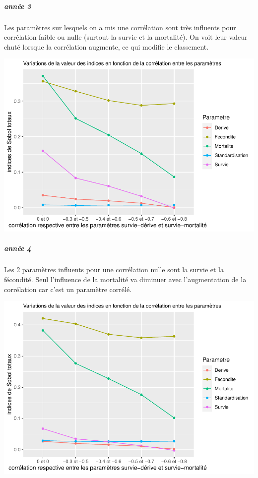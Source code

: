\documentclass[
]{article}
\begin{document}
\hypertarget{annuxe9e-3-4}{%
\subparagraph{année 3}\label{annuxe9e-3-4}}

Les paramètres sur lesquels on a mis une corrélation sont très influents
pour corrélation faible ou nulle (surtout la survie et la mortalité). On
voit leur valeur chuté lorsque la corrélation augmente, ce qui modifie
le classement.

\includegraphics{rapport_files/figure-latex/partygsbte-1.pdf}

\hypertarget{annuxe9e-4-4}{%
\subparagraph{année 4}\label{annuxe9e-4-4}}

Les 2 paramètres influents pour une corrélation nulle sont la survie et
la fécondité. Seul l'influence de la mortalité va diminuer avec
l'augmentation de la corrélation car c'est un paramètre corrélé.

\includegraphics{rapport_files/figure-latex/aprtygsbte-1.pdf}
\end{document}
